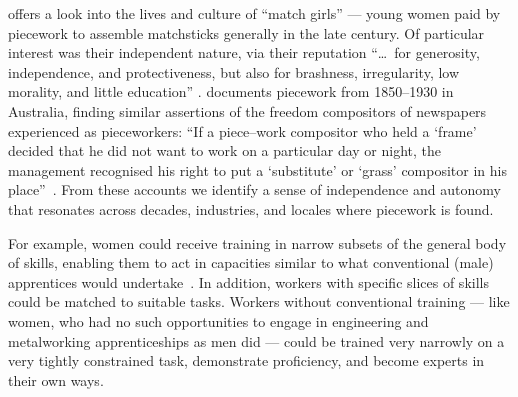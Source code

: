 \documentclass[trackingWork]{subfiles}
\begin{document}
\citeauthor{10.2307/3827491} offers a look into the lives and culture of ``match girls''
--- young women paid by piecework to assemble matchsticks generally in the late  century.
Of particular interest was their independent nature, via their reputation ``\dots~for generosity, independence, and protectiveness,
but also for brashness, irregularity, low morality, and little education''
\cite{10.2307/3827491}.
\citeauthor{10.2307/27508091} documents piecework from 1850--1930 in Australia,
finding similar assertions of the freedom compositors of newspapers experienced as pieceworkers:
``If a piece--work compositor who held a `frame' decided that he did not want to work on a particular day or night,
the management recognised his right to put a `substitute' or `grass' compositor in his place''~\cite{10.2307/27508091}.
From these accounts we identify a sense of independence and autonomy that resonates across decades, industries, and locales where piecework is found.

For example, women could receive training in narrow subsets of the general body of skills, enabling them to act in capacities similar to what conventional (male) apprentices would undertake~\cite{hart2013rise}. 
In addition, workers with specific slices of skills could be matched to suitable tasks.
Workers without conventional training
--- like women, who had no such opportunities
to engage in engineering and metalworking apprenticeships as men did ---
could be trained very narrowly on a very tightly constrained task,
demonstrate proficiency, and become experts in their own ways.
\end{document}
